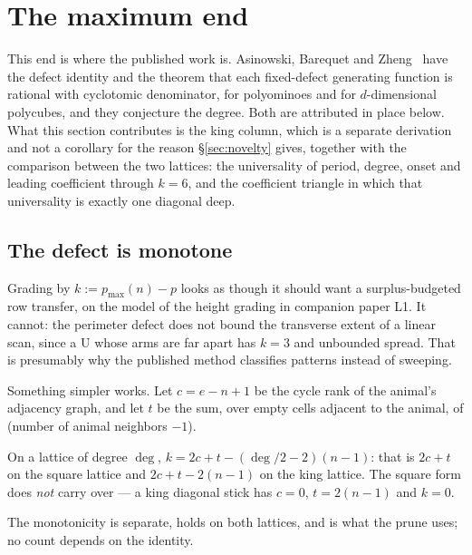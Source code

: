 \documentclass[11pt]{article}
\newcommand{\pmaxx}{p_{\max}}
\begin{document}
\section{The maximum end}
\label{sec:max}

This end is where the published work is. Asinowski, Barequet and
Zheng~\cite{abz2018} have the defect identity and the theorem that each
fixed-defect generating function is rational with cyclotomic denominator, for
polyominoes and for $d$-dimensional polycubes, and they conjecture the degree.
Both are attributed in place below. What this section contributes is the king
column, which is a separate derivation and not a corollary for the reason
\S\ref{sec:novelty} gives, together with the comparison between the two
lattices: the universality of period, degree, onset and leading coefficient
through $k = 6$, and the coefficient triangle in which that universality is
exactly one diagonal deep.

\subsection{The defect is monotone}

Grading by $k := \pmaxx(n) - p$ looks as though it should want a
surplus-budgeted row transfer, on the model of the height grading in companion
paper L1. It cannot: the perimeter defect does not bound the transverse extent
of a linear scan, since a U whose arms are far apart has $k = 3$ and unbounded
spread. That is presumably why the published method classifies patterns instead
of sweeping.

Something simpler works. Let $c = e - n + 1$ be the cycle rank of the animal's
adjacency graph, and let $t$ be the sum, over empty cells adjacent to the
animal, of (number of animal neighbors $- 1$).

\begin{proposition}
\label{prop:kct}
On a lattice of degree $\deg$,
$k = 2c + t - (\deg/2 - 2)(n-1)$: that is $2c+t$ on the square lattice and
$2c + t - 2(n-1)$ on the king lattice. The square form does \emph{not} carry
over --- a king diagonal stick has $c = 0$, $t = 2(n-1)$ and $k = 0$.
\end{proposition}

\noindent The monotonicity is separate, holds on both lattices, and is what the
prune uses; no count depends on the identity.
\end{document}
